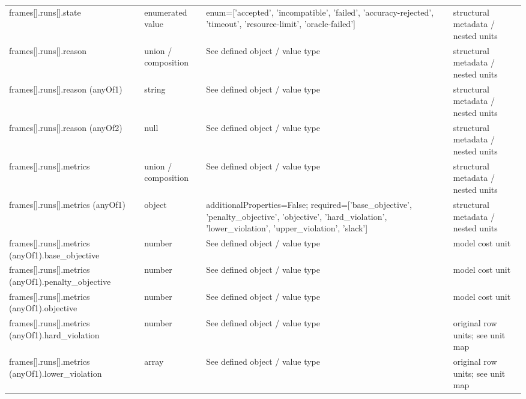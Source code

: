 \begin{longtable}{@{}>{\raggedright\arraybackslash}p{}>{\raggedright\arraybackslash}p{}>{\raggedright\arraybackslash}p{}>{\raggedright\arraybackslash}p{}@{}}
frames[].\allowbreak{}runs[].\allowbreak{}state & enumerated value & enum=\allowbreak{}['accepted', 'incompatible', 'failed', 'accuracy-\allowbreak{}rejected', 'timeout', 'resource-\allowbreak{}limit', 'oracle-\allowbreak{}failed'] & structural metadata /\allowbreak{} nested units\\
frames[].\allowbreak{}runs[].\allowbreak{}reason & union /\allowbreak{} composition & See defined object /\allowbreak{} value type & structural metadata /\allowbreak{} nested units\\
frames[].\allowbreak{}runs[].\allowbreak{}reason (anyOf1) & string & See defined object /\allowbreak{} value type & structural metadata /\allowbreak{} nested units\\
frames[].\allowbreak{}runs[].\allowbreak{}reason (anyOf2) & null & See defined object /\allowbreak{} value type & structural metadata /\allowbreak{} nested units\\
frames[].\allowbreak{}runs[].\allowbreak{}metrics & union /\allowbreak{} composition & See defined object /\allowbreak{} value type & structural metadata /\allowbreak{} nested units\\
frames[].\allowbreak{}runs[].\allowbreak{}metrics (anyOf1) & object & additionalProperties=\allowbreak{}False; required=\allowbreak{}['base\_\allowbreak{}objective', 'penalty\_\allowbreak{}objective', 'objective', 'hard\_\allowbreak{}violation', 'lower\_\allowbreak{}violation', 'upper\_\allowbreak{}violation', 'slack'] & structural metadata /\allowbreak{} nested units\\
frames[].\allowbreak{}runs[].\allowbreak{}metrics (anyOf1).\allowbreak{}base\_\allowbreak{}objective & number & See defined object /\allowbreak{} value type & model cost unit\\
frames[].\allowbreak{}runs[].\allowbreak{}metrics (anyOf1).\allowbreak{}penalty\_\allowbreak{}objective & number & See defined object /\allowbreak{} value type & model cost unit\\
frames[].\allowbreak{}runs[].\allowbreak{}metrics (anyOf1).\allowbreak{}objective & number & See defined object /\allowbreak{} value type & model cost unit\\
frames[].\allowbreak{}runs[].\allowbreak{}metrics (anyOf1).\allowbreak{}hard\_\allowbreak{}violation & number & See defined object /\allowbreak{} value type & original row units; see unit map\\
frames[].\allowbreak{}runs[].\allowbreak{}metrics (anyOf1).\allowbreak{}lower\_\allowbreak{}violation & array & See defined object /\allowbreak{} value type & original row units; see unit map\\

\end{longtable}
